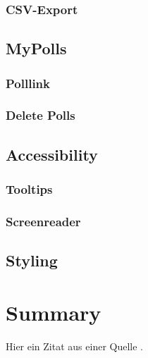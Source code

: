 \documentclass[a4paper,12pt]{report}
\begin{document}
\subsection{CSV-Export}
\section{MyPolls}
\subsection{Polllink}
\subsection{Delete Polls}
\section{Accessibility}
\subsection{Tooltips}
\subsection{Screenreader}
\section{Styling}
\chapter{Summary}
\lipsum[1]

Hier ein Zitat aus einer Quelle \cite{author2023example}.



\printbibliography

\listoffigures
\newpage
\end{document}
